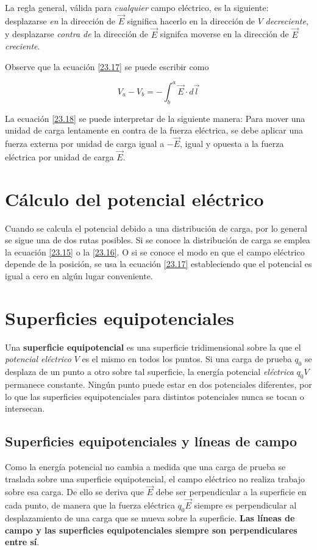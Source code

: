 La regla general, válida para \textit{cualquier} campo eléctrico, es la siguiente: desplazarse \textit{en} la dirección de $\vec{E}$ significa hacerlo en la dirección de $V$ \textit{decreciente}, y desplazarse \textit{contra de} la dirección de $\vec{E}$ signifca moverse en la dirección de $\vec{E}$ \textit{creciente}.

Observe que la ecuación \ref{23.17} se puede escribir como 

\begin{equation}\label{23.18}
V_a-V_b=-\int_b^{a}\vec{E}\cdot d\vec{l}
\end{equation}

La ecuación \ref{23.18} se puede interpretar de la siguiente manera: Para mover una unidad de carga lentamente en contra de la fuerza eléctrica, se debe aplicar una fuerza externa por unidad de carga igual a $-\vec{E}$, igual y opuesta a la fuerza eléctrica por unidad de carga $\vec{E}$.

\section{Cálculo del potencial eléctrico}
Cuando se calcula el potencial debido a una distribución de carga, por lo general se sigue una de dos rutas posibles. Si se conoce la distribución de carga se emplea la ecuación \ref{23.15} o la \ref{23.16}. O si se conoce el modo en que el campo eléctrico depende de la posición, se usa la ecuación \ref{23.17} estableciendo que el potencial es igual a cero en algún lugar conveniente.

\section{Superficies equipotenciales}
Una \textbf{superficie equipotencial} es una superficie tridimensional sobre la que el \textit{potencial eléctrico} $V$ es el mismo en todos los puntos. Si una carga de prueba $q_0$ se desplaza de un punto a otro sobre tal superficie, la energía potencial \textit{eléctrica} $q_0V$ permanece constante. Ningún punto puede estar en dos potenciales diferentes, por lo que las superficies equipotenciales para distintos potenciales nunca se tocan o intersecan.

\subsection{Superficies equipotenciales y líneas de campo}
Como la energía potencial no cambia a medida que una carga de prueba se traslada sobre una superficie equipotencial, el campo eléctrico no realiza trabajo sobre esa carga. De ello se deriva que $\vec{E}$ debe ser perpendicular a la superficie en cada punto, de manera que la fuerza eléctrica $q_0\vec{E}$ siempre es perpendicular al desplazamiento de una carga que se mueva sobre la superficie. \textbf{Las líneas de campo y las superficies equipotenciales siempre son perpendiculares entre sí}.

